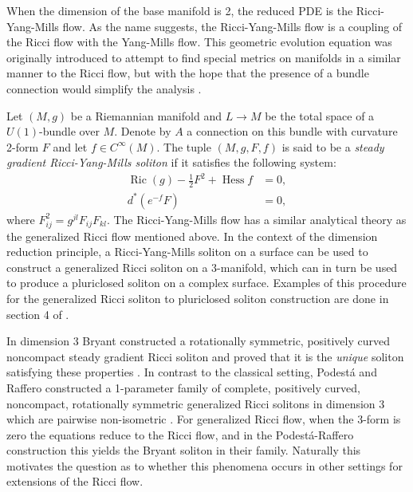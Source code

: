 \documentclass[12pt, a4paper, reqno, oneside]{amsart}
\DeclareMathOperator{\Hess}{Hess}
\DeclareMathOperator{\Ric}{Ric}
\numberwithin{equation}{section}
\theoremstyle{plain}
\theoremstyle{definition}
\theoremstyle{plain}
\begin{document}
When the dimension of the base manifold is 2, the reduced PDE is the Ricci-Yang-Mills flow. As the name suggests, the Ricci-Yang-Mills flow is a coupling of the Ricci flow with the Yang-Mills flow. This geometric evolution equation was originally introduced to attempt to find special metrics on manifolds in a similar manner to the Ricci flow, but with the hope that the presence of a bundle connection would simplify the analysis \cite{streetsRYMFlow2007}. 

Let $(M,g)$ be a Riemannian manifold and $L\to M$ be the total space of a $U(1)$-bundle over $M$. Denote by $A$ a connection on this bundle with curvature 2-form $F$ and let $f\in C^{\infty}(M)$. The tuple $(M,g,F,f)$ is said to be a \emph{steady gradient Ricci-Yang-Mills soliton} if it satisfies the following system:
\begin{equation*}
  \begin{split}
    \Ric(g)-\frac{1}{2}F^2+\Hess f &= 0,\\
    d^{*}(e^{-f}F) &= 0,
  \end{split}
\end{equation*}
where $F_{ij}^{2}=g^{jl}F_{ij}F_{kl}$. The Ricci-Yang-Mills flow has a similar analytical theory as the generalized Ricci flow mentioned above. In the context of the dimension reduction principle, a Ricci-Yang-Mills soliton on a surface can be used to construct a generalized Ricci soliton on a 3-manifold, which can in turn be used to produce a pluriclosed soliton on a complex surface. Examples of this procedure for the generalized Ricci soliton to pluriclosed soliton construction are done in section 4 of \cite{streetsClassSolitonsPluriclosedFlow2019}.

In dimension 3 Bryant constructed a rotationally symmetric, positively curved noncompact steady gradient Ricci soliton and proved that it is the \textit{unique} soliton satisfying these properties \cite{bryantRFSol3DRotSym2005}. In contrast to the classical setting, Podest\'a and Raffero constructed a 1-parameter family of complete, positively curved, noncompact, rotationally symmetric generalized Ricci solitons in dimension 3 which are pairwise non-isometric \cite{podestaRafferoPosCurvSO3GenRS2025}. For generalized Ricci flow, when the 3-form is zero the equations reduce to the Ricci flow, and in the Podest\'a-Raffero construction this yields the Bryant soliton in their family. Naturally this motivates the question as to whether this phenomena occurs in other settings for extensions of the Ricci flow.
\end{document}
